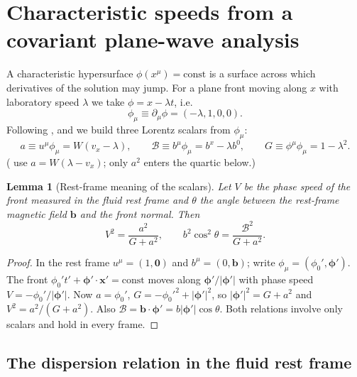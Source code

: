 \documentclass[11pt,a4paper,oneside,openany]{book}
\newcommand{\textcite}{\citet}
\theoremstyle{definition}
\theoremstyle{plain}
\newtheorem{lemma}{Lemma}[chapter]
\theoremstyle{remark}
\newcommand{\calB}{\mathcal{B}}
\begin{document}
\section{Characteristic speeds from a covariant plane-wave analysis}\label{sec:covariant}

A characteristic hypersurface $\phi(x^\mu)=\text{const}$ is a surface across which
derivatives of the solution may jump. For a plane front moving along $x$ with
laboratory speed $\lambda$ we take $\phi=x-\lambda t$, i.e.
\begin{equation}
\phi_\mu\equiv\partial_\mu\phi=(-\lambda,1,0,0).
\end{equation}
Following \textcite{Anile1989}, \textcite{Komissarov1999} and \textcite{Anton2010} we
build three Lorentz scalars from $\phi_\mu$:
\begin{equation}\label{eq:aBG}
a\equiv u^\mu\phi_\mu=W(v_x-\lambda),\qquad
\calB\equiv b^\mu\phi_\mu=b^x-\lambda b^0,\qquad
G\equiv\phi^\mu\phi_\mu=1-\lambda^2 .
\end{equation}
(\textcite{MignoneBodo2006} use $a=W(\lambda-v_x)$; only $a^2$ enters the quartic below.)

\begin{lemma}[Rest-frame meaning of the scalars]\label{lem:restframe}
Let $V$ be the phase speed of the front measured in the fluid rest frame and $\theta$ the
angle between the rest-frame magnetic field $\bm b$ and the front normal. Then
\begin{equation}\label{eq:Vrest}
V^2=\frac{a^2}{G+a^2},\qquad b^2\cos^2\theta=\frac{\calB^2}{G+a^2}.
\end{equation}
\end{lemma}

\begin{proof}
In the rest frame $u^\mu=(1,\bm 0)$ and $b^\mu=(0,\bm b)$; write $\phi_\mu=(\phi_0',\bm\phi')$.
The front $\phi_0't'+\bm\phi'\cdot\bm x'=\text{const}$ moves along $\bm\phi'/|\bm\phi'|$
with phase speed $V=-\phi_0'/|\bm\phi'|$. Now $a=\phi_0'$, $G=-\phi_0'^2+|\bm\phi'|^2$, so
$|\bm\phi'|^2=G+a^2$ and $V^2=a^2/(G+a^2)$. Also $\calB=\bm b\cdot\bm\phi'
=b|\bm\phi'|\cos\theta$. Both relations involve only scalars and hold in every frame.
\end{proof}

\subsection{The dispersion relation in the fluid rest frame}
\end{document}
